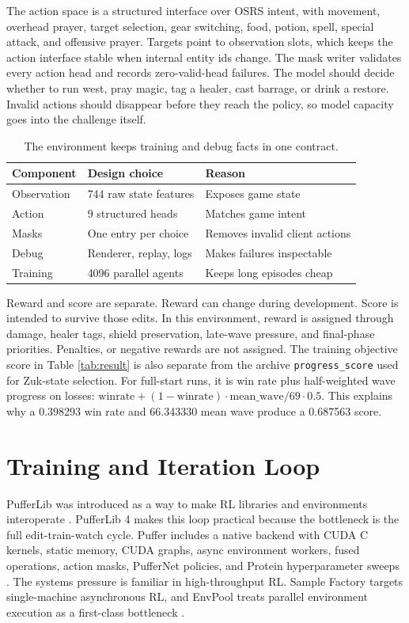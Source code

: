 \documentclass[10pt]{article}
\begin{document}
The action space is a structured interface over OSRS intent, with movement, overhead prayer, target selection, gear switching, food, potion, spell, special attack, and offensive prayer. Targets point to observation slots, which keeps the action interface stable when internal entity ids change. The mask writer validates every action head and records zero-valid-head failures. The model should decide whether to run west, pray magic, tag a healer, cast barrage, or drink a restore. Invalid actions should disappear before they reach the policy, so model capacity goes into the challenge itself.

\begin{table}[H]
\centering
\small
\begin{tabular}{lll}
\toprule
Component & Design choice & Reason \\
\midrule
Observation & 744 raw state features & Exposes game state \\
Action & 9 structured heads & Matches game intent \\
Masks & One entry per choice & Removes invalid client actions \\
Debug & Renderer, replay, logs & Makes failures inspectable \\
Training & 4096 parallel agents & Keeps long episodes cheap \\
\bottomrule
\end{tabular}
\caption{The environment keeps training and debug facts in one contract.}
\label{tab:surface}
\end{table}

Reward and score are separate. Reward can change during development. Score is intended to survive those edits. In this environment, reward is assigned through damage, healer tags, shield preservation, late-wave pressure, and final-phase priorities. Penalties, or negative rewards are not assigned. The training objective score in Table \ref{tab:result} is also separate from the archive \texttt{progress\_score} used for Zuk-state selection. For full-start runs, it is win rate plus half-weighted wave progress on losses: $\mathrm{winrate} + (1-\mathrm{winrate}) \cdot \mathrm{mean\_wave}/69 \cdot 0.5$. This explains why a 0.398293 win rate and 66.343330 mean wave produce a 0.687563 score.

\section{Training and Iteration Loop}

PufferLib was introduced as a way to make RL libraries and environments interoperate \cite{pufferlib-paper}. PufferLib 4 makes this loop practical because the bottleneck is the full edit-train-watch cycle. Puffer includes a native backend with CUDA C kernels, static memory, CUDA graphs, async environment workers, fused operations, action masks, PufferNet policies, and Protein hyperparameter sweeps \cite{puffer-docs}. The systems pressure is familiar in high-throughput RL. Sample Factory targets single-machine asynchronous RL, and EnvPool treats parallel environment execution as a first-class bottleneck \cite{sample-factory, envpool}.
\end{document}
